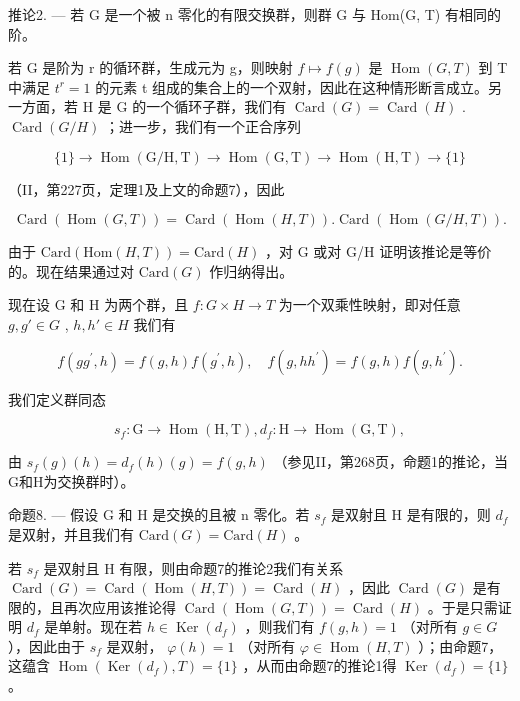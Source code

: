 推论2. --- 若 G 是一个被 n 零化的有限交换群，则群 G 与 Hom(G, T) 有相同的阶。

若 G 是阶为 r 的循环群，生成元为 g，则映射 \(f \mapsto f(g)\) 是 \(\operatorname{Hom}(G, T)\) 到 T 中满足 \(t^{r} = 1\) 的元素 t 组成的集合上的一个双射，因此在这种情形断言成立。另一方面，若 H 是 G 的一个循环子群，我们有 \(\operatorname{Card}(G) = \operatorname{Card}(H)\) . \(\operatorname{Card}(G/H)\) ；进一步，我们有一个正合序列

\[
\{1 \} \rightarrow \operatorname{Hom} (\mathrm{G} / \mathrm{H}, \mathrm{T}) \rightarrow \operatorname{Hom} (\mathrm{G}, \mathrm{T}) \rightarrow \operatorname{Hom} (\mathrm{H}, \mathrm{T}) \rightarrow \{1 \}
\]

（II，第227页，定理1及上文的命题7），因此

\[
\operatorname{Card} (\operatorname{Hom} (G, T)) = \operatorname{Card} (\operatorname{Hom} (H, T)). \operatorname{Card} (\operatorname{Hom} (G / H, T)).
\]

由于 \(\text{Card}(\text{Hom}(H, T)) = \text{Card}(H)\) ，对 G 或对 G/H 证明该推论是等价的。现在结果通过对 \(\text{Card}(G)\) 作归纳得出。

现在设 G 和 H 为两个群，且 \(f: G \times H \to T\) 为一个双乘性映射，即对任意 \(g, g' \in G\) , \(h, h' \in H\) 我们有

\[
f (g g ^ {\prime}, h) = f (g, h) f (g ^ {\prime}, h), \quad f (g, h h ^ {\prime}) = f (g, h) f (g, h ^ {\prime}).
\]

我们定义群同态

\[
s _ {f} \colon \mathrm{G} \to \operatorname{Hom} (\mathrm{H}, \mathrm{T}), d _ {f} \colon \mathrm{H} \to \operatorname{Hom} (\mathrm{G}, \mathrm{T}),
\]

由 \(s_f(g)(h) = d_f(h)(g) = f(g, h)\) （参见II，第268页，命题1的推论，当G和H为交换群时）。

命题8. --- 假设 G 和 H 是交换的且被 n 零化。若 \(s_{f}\) 是双射且 H 是有限的，则 \(d_{f}\) 是双射，并且我们有 \(\text{Card}(G) = \text{Card}(H)\) 。

若 \(s_{f}\) 是双射且 H 有限，则由命题7的推论2我们有关系 \(\operatorname{Card}(G) = \operatorname{Card}(\operatorname{Hom}(H, T)) = \operatorname{Card}(H)\) ，因此 \(\operatorname{Card}(G)\) 是有限的，且再次应用该推论得 \(\operatorname{Card}(\operatorname{Hom}(G, T)) = \operatorname{Card}(H)\) 。于是只需证明 \(d_{f}\) 是单射。现在若 \(h \in \operatorname{Ker}(d_{f})\) ，则我们有 \(f(g, h) = 1\) （对所有 \(g \in G\) ），因此由于 \(s_{f}\) 是双射， \(\varphi(h) = 1\) （对所有 \(\varphi \in \operatorname{Hom}(H, T)\) ）；由命题7，这蕴含 \(\operatorname{Hom}(\operatorname{Ker}(d_{f}), T) = \{1\}\) ，从而由命题7的推论1得 \(\operatorname{Ker}(d_{f}) = \{1\}\) 。


